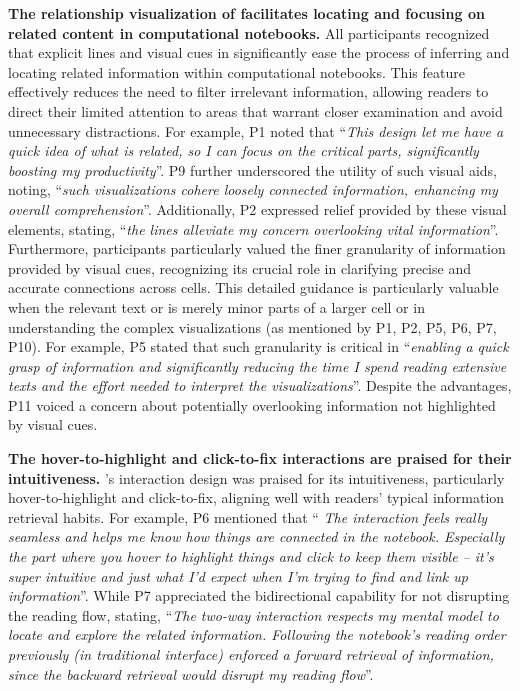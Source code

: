 \textbf{The relationship visualization of \tool facilitates locating and focusing on related content in computational notebooks.}
All participants recognized that explicit lines and visual cues in \tool significantly ease the process of inferring and locating related information within computational notebooks. 
This feature effectively reduces the need to filter irrelevant information, allowing readers to direct their limited attention to areas that warrant closer examination and avoid unnecessary distractions. 
For example, P1 noted that ``\textit{This design let me have a quick idea of what is related, so I can focus on the critical parts, significantly boosting my productivity}''.
P9 further underscored the utility of such visual aids, noting, ``\textit{such visualizations cohere loosely connected information, enhancing my overall comprehension}''.
Additionally, P2 expressed relief provided by these visual elements, stating, ``\textit{the lines alleviate my concern  overlooking vital information}''.
Furthermore, participants particularly valued the finer granularity of information provided by visual cues, recognizing its crucial role in clarifying precise and accurate connections across cells. 
This detailed guidance is particularly valuable when the relevant text or  is merely minor parts of a larger cell or in understanding the complex visualizations (as mentioned by P1, P2, P5, P6, P7, P10).
For example, P5 stated that such granularity is critical in ``\textit{enabling a quick grasp of information and significantly reducing the time I spend reading extensive texts and the effort needed to interpret the visualizations}''.
Despite the advantages, P11 voiced a concern about potentially overlooking information not highlighted by visual cues.


\textbf{The hover-to-highlight and click-to-fix interactions are praised for their intuitiveness.}
\tool's interaction design was praised for its intuitiveness, particularly hover-to-highlight and click-to-fix, aligning well with readers' typical information retrieval habits. 
For example, P6 mentioned that ``\textit{
The interaction feels really seamless and helps me know how things are connected in the notebook. 
Especially the part where you hover to highlight things and click to keep them visible – it's super intuitive and just what I'd expect when I'm trying to find and link up information}''.
While P7 appreciated the bidirectional capability for not disrupting the reading flow, stating, ``\textit{The two-way interaction respects my mental model to locate and explore the related information. 
Following the notebook's reading order previously (in  traditional interface) enforced a forward retrieval of information, since the backward retrieval would disrupt my reading flow}''.


